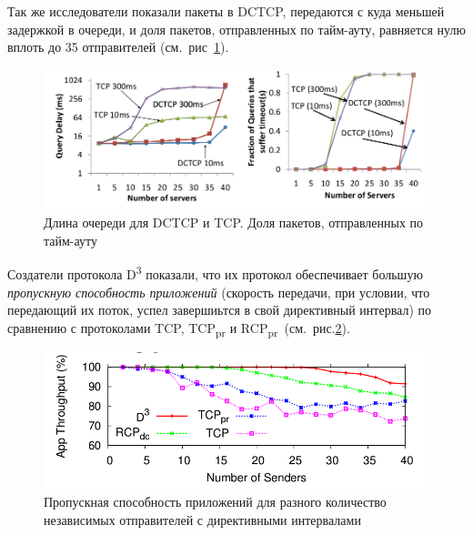 \documentclass[14pt, a4paper,oneside]{extarticle}
\begin{document}
Так же исследователи показали пакеты в DCTCP, передаются с куда меньшей задержкой в очереди, и доля пакетов, отправленных по тайм-ауту, равняется нулю вплоть до 35 отправителей (см.~рис~\ref{delays}).

\begin{figure}
	\includegraphics[width=0.7\linewidth]{delays1}
	\caption{Длина очереди для DCTCP и TCP. Доля пакетов, отправленных по тайм-ауту}
	\label{delays}
\end{figure}

Создатели протокола D\textsuperscript{3} показали, что их протокол обеспечивает большую \emph{пропускную способность приложений} (скорость передачи, при условии, что передающий их поток, успел завершиьтся в свой директивный интервал) по сравнению с протоколами TCP, TCP\textsubscript{pr} и RCP\textsubscript{pr}~(см.~рис.\ref{d3_throughput}).  
\begin{figure}
	\includegraphics[width=0.7\linewidth]{d3_throughput}
	\caption{Пропускная способность приложений для разного количество независимых отправителей с директивными интервалами}
	\label{d3_throughput}
\end{figure}
\end{document}

